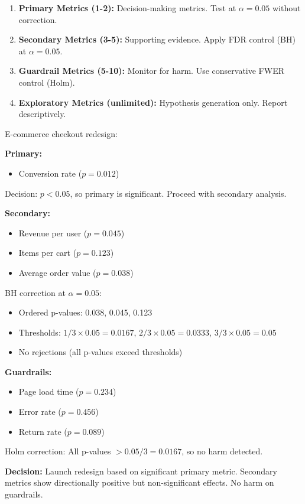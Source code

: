 \begin{enumerate}
    \item \textbf{Primary Metrics (1-2):} Decision-making metrics. Test at $\alpha = 0.05$ without correction.

    \item \textbf{Secondary Metrics (3-5):} Supporting evidence. Apply FDR control (BH) at $\alpha = 0.05$.

    \item \textbf{Guardrail Metrics (5-10):} Monitor for harm. Use conservative FWER control (Holm).

    \item \textbf{Exploratory Metrics (unlimited):} Hypothesis generation only. Report descriptively.
\end{enumerate}

\begin{example}
E-commerce checkout redesign:

\textbf{Primary:}
\begin{itemize}
    \item Conversion rate ($p = 0.012$)
\end{itemize}
Decision: $p < 0.05$, so primary is significant. Proceed with secondary analysis.

\textbf{Secondary:}
\begin{itemize}
    \item Revenue per user ($p = 0.045$)
    \item Items per cart ($p = 0.123$)
    \item Average order value ($p = 0.038$)
\end{itemize}

BH correction at $\alpha = 0.05$:
\begin{itemize}
    \item Ordered p-values: 0.038, 0.045, 0.123
    \item Thresholds: $1/3 \times 0.05 = 0.0167$, $2/3 \times 0.05 = 0.0333$, $3/3 \times 0.05 = 0.05$
    \item No rejections (all p-values exceed thresholds)
\end{itemize}

\textbf{Guardrails:}
\begin{itemize}
    \item Page load time ($p = 0.234$)
    \item Error rate ($p = 0.456$)
    \item Return rate ($p = 0.089$)
\end{itemize}

Holm correction: All p-values $> 0.05/3 = 0.0167$, so no harm detected.

\textbf{Decision:} Launch redesign based on significant primary metric. Secondary metrics show directionally positive but non-significant effects. No harm on guardrails.
\end{example}

